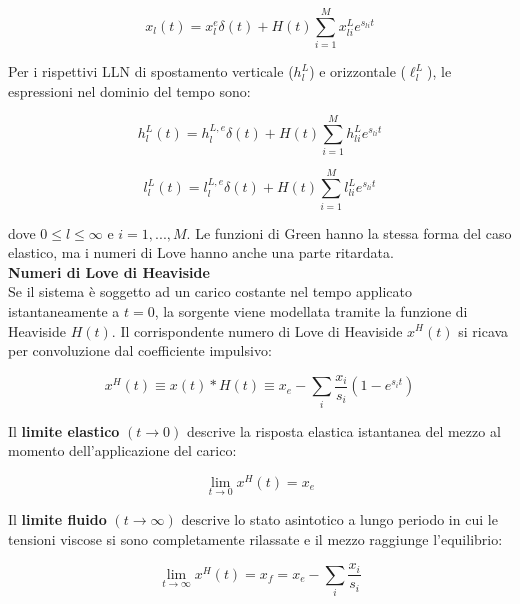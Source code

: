 \documentclass[a4paper,12pt]{book}
\begin{document}
\begin{equation}
    x_l (t) = x_l^{e} \delta (t) + H(t) \sum_{i=1} ^M x_{li}^L e^{s_{li}t}
\end{equation}

\noindent
Per i rispettivi LLN di spostamento verticale ($h_l^L$) e orizzontale ($\ell_l^L$), le espressioni nel dominio del tempo sono:

\begin{equation}
    h_l^L (t) = h_l^{L,e} \delta (t) + H(t) \sum_{i=1} ^M h_{li}^L e^{s_{li}t}
\end{equation}

\begin{equation}
    l_l^L (t) = l_l^{L,e} \delta (t) + H(t) \sum_{i=1} ^M l_{li}^L e^{s_{li}t}
\end{equation}

\noindent
dove $0 \le l \le \infty$ e $i = 1,..., M$.
Le funzioni di Green hanno la stessa forma del caso elastico, ma i numeri di Love hanno anche una parte ritardata.\\

\noindent \textbf{\textcolor{colore7}{Numeri di Love di Heaviside}}\\

\noindent
Se il sistema è soggetto ad un carico costante nel tempo applicato istantaneamente a $t=0$, la sorgente viene modellata tramite la funzione di Heaviside $H(t)$.
Il corrispondente numero di Love di Heaviside $x^H(t)$ si ricava per convoluzione dal coefficiente impulsivo:

\begin{equation}
    x^H(t) \equiv x(t) * H(t) \equiv x_e - \sum_i \frac{x_i}{s_i} (1-e^{s_i t})
\end{equation}

\noindent
Il \textbf{limite elastico} $(t\longrightarrow 0)$ descrive la risposta elastica istantanea del mezzo al momento dell'applicazione del carico:

\begin{equation}
    \lim_{t \longrightarrow 0} x^H(t) = x_e
\end{equation}

\noindent
Il \textbf{limite fluido} $(t\longrightarrow \infty)$ descrive lo stato asintotico a lungo periodo in cui le tensioni viscose si sono completamente rilassate e il mezzo raggiunge l'equilibrio:

\begin{equation}
    \lim_{t \longrightarrow \infty} x^H(t) = x_f = x_e - \sum_i \frac{x_i}{s_i}
\end{equation}
\end{document}

